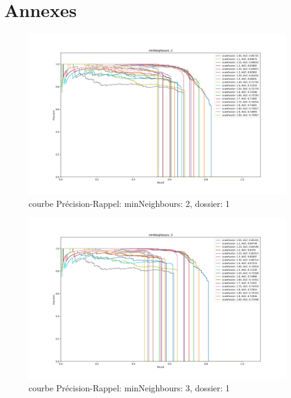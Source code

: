 \documentclass[a4paper,11pt]{article}
\begin{document}
\section{Annexes}
    

	\begin{figure}[H]
	    \begin{center}
		\includegraphics[scale = 0.4]{images/courbes/folder_01_minN_2.png}
		\caption{courbe Précision-Rappel: minNeighbours: 2, dossier: 1}
		\label{fig:minN_2}
	    \end{center}
	\end{figure}

	\begin{figure}[H]
	    \begin{center}
		\includegraphics[scale = 0.4]{images/courbes/folder_01_minN_3.png}
		\caption{courbe Précision-Rappel: minNeighbours: 3, dossier: 1}
		\label{fig:minN_2}
	    \end{center}
	\end{figure}
\end{document}
